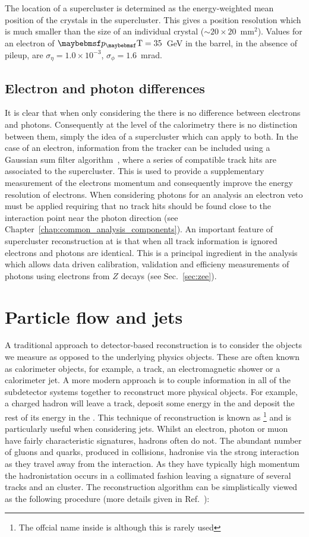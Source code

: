 The location of a supercluster is determined as the energy-weighted mean position of the crystals in the supercluster. This gives a position resolution which is much smaller than the size of an individual crystal ($\sim20\times20$~mm$^{2}$). Values for an electron of $\pT=35$~GeV in the \ECAL barrel, in the absence of pileup, are $\sigma_{\eta}=1.0\times10^{-3}$, $\sigma_{\phi}=1.6$~mrad.

\subsection{Electron and photon differences}

It is clear that when only considering the \ECAL there is no difference between electrons and photons. Consequently at the level of the calorimetry there is no distinction between them, simply the idea of a supercluster which can apply to both. In the case of an electron, information from the tracker can be included using a Gaussian sum filter algorithm~\cite{tracker_electron_reco}, where a series of compatible track hits are associated to the supercluster. This is used to provide a supplementary measurement of the electrons momentum and consequently improve the energy resolution of electrons. When considering photons for an analysis an electron veto must be applied requiring that no track hits should be found close to the interaction point near the photon direction (see Chapter~\ref{chap:common_analysis_components}). An important feature of supercluster reconstruction at \CMS is that when all track information is ignored electrons and photons are identical. This is a principal ingredient in the \Hgg analysis which allows data driven calibration, validation and efficieny measurements of photons using electrons from $Z$ decays (see Sec.~\ref{sec:zee}).

\section{Particle flow and jets}
\label{sec:pflow_jets}
A traditional approach to detector-based reconstruction is to consider the objects we measure as opposed to the underlying physics objects. These are often known as calorimeter objects, for example, a track, an electromagnetic shower or a calorimeter jet. A more modern approach is to couple information in all of the subdetector systems together to reconstruct more physical objects. For example, a charged hadron will leave a track, deposit some energy in the \ECAL and deposit the rest of its energy in the \HCAL. This technique of reconstruction is known as \PF\footnote{The offcial name inside \CMS is \GED although this is rarely used} and is particularly useful when considering jets. Whilst an electron, photon or muon have fairly characteristic signatures, hadrons often do not. The abundant number of gluons and quarks, produced in \LHC collisions, hadronise via the strong interaction as they travel away from the interaction. As they have typically high momentum the hadronistation occurs in a collimated fashion leaving a signature of several tracks and an \HCAL cluster. The \PF reconstruction algorithm can be simplistically viewed as the following procedure (more details given in Ref.~\cite{cms_pf_algo}):

